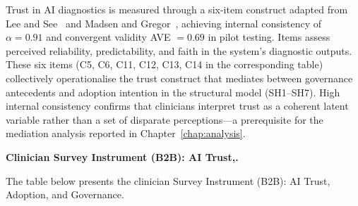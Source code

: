 Trust in AI diagnostics is measured through a six-item construct adapted from Lee and See~\cite{lee2004trust} and Madsen and Gregor~\cite{madsen2000measuring}, achieving internal consistency of $\alpha = 0.91$ and convergent validity AVE $= 0.69$ in pilot testing. Items assess perceived reliability, predictability, and faith in the system's diagnostic outputs. These six items (C5, C6, C11, C12, C13, C14 in the corresponding table) collectively operationalise the trust construct that mediates between governance antecedents and adoption intention in the structural model (SH1--SH7). High internal consistency confirms that clinicians interpret trust as a coherent latent variable rather than a set of disparate perceptions---a prerequisite for the mediation analysis reported in Chapter~\ref{chap:analysis}.


\noindent\textbf{Clinician Survey Instrument (B2B): AI Trust,.}

\noindent The table below presents the clinician Survey Instrument (B2B): AI Trust, Adoption, and Governance.

